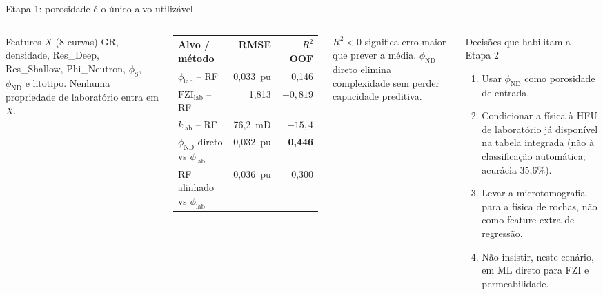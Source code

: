 \documentclass[aspectratio=169,10pt]{beamer}
\newcommand{\philab}{\ensuremath{\phi_{\mathrm{lab}}}}
\newcommand{\fzilab}{\ensuremath{\mathrm{FZI}_{\mathrm{lab}}}}
\newcommand{\phiND}{\ensuremath{\phi_{\mathrm{ND}}}}
\newcommand{\phiS}{\ensuremath{\phi_{\mathrm{S}}}}
\begin{document}
\begin{frame}{Etapa 1: porosidade \'e o \'unico alvo utiliz\'avel}
  \begin{columns}[T,onlytextwidth]
    \footnotesize
    \begin{block}{Features $X$ (8 curvas)}
      \scriptsize
      GR, densidade, Res\_Deep, Res\_Shallow, Phi\_Neutron,
      \phiS{}, \phiND{} e litotipo.
      Nenhuma propriedade de laborat\'orio entra em $X$.
    \end{block}
    \centering
    \vspace{0.06cm}
    \begin{tabular}{lrr}
      \toprule
      Alvo / m\'etodo & RMSE & $R^2$ OOF \\
      \midrule
      \philab{} -- RF & 0,033~pu & 0,146 \\
      \fzilab{} -- RF & 1,813 & $-0{,}819$ \\
      $k_{\mathrm{lab}}$ -- RF & 76,2~mD & $-15{,}4$ \\
      \midrule
      \phiND{} direto vs \philab{} & 0,032~pu & \textbf{0,446} \\
      RF alinhado vs \philab{} & 0,036~pu & 0,300 \\
      \bottomrule
    \end{tabular}
    \vspace{0.08cm}
    \raggedright
    {\scriptsize $R^2<0$ significa erro maior que prever a m\'edia.
    \phiND{} direto elimina complexidade sem perder capacidade preditiva.}
    \begin{block}{Decis\~oes que habilitam a Etapa 2}
      \scriptsize
      \begin{enumerate}
        \item Usar \phiND{} como porosidade de entrada.
        \item Condicionar a f\'isica \`a HFU de laborat\'orio j\'a
              dispon\'ivel na tabela integrada (n\~ao \`a classifica\c{c}\~ao
              autom\'atica; acur\'acia 35,6\%).
        \item Levar a microtomografia para a f\'isica de rochas, n\~ao
              como feature extra de regress\~ao.
        \item N\~ao insistir, neste cen\'ario, em ML direto para FZI e
              permeabilidade.
      \end{enumerate}
    \end{block}
  \end{columns}
\end{frame}
\end{document}
